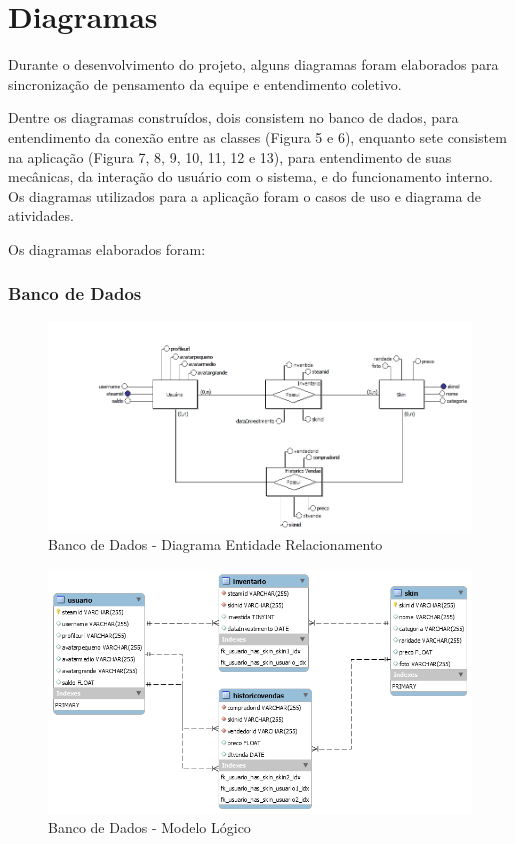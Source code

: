 \chapter[Diagramas]{Diagramas}
Durante o desenvolvimento do projeto, alguns diagramas foram elaborados para sincronização de pensamento da equipe e entendimento coletivo.

Dentre os diagramas construídos, dois consistem no banco de dados, para entendimento da conexão entre as classes (Figura 5 e 6), enquanto sete consistem na aplicação (Figura 7, 8, 9, 10, 11, 12 e 13), para entendimento de suas mecânicas, da interação do usuário com o sistema, e do funcionamento interno. Os diagramas utilizados para a aplicação foram o casos de uso e diagrama de atividades.

Os diagramas elaborados foram:

 \subsection{Banco de Dados}

  \begin{figure}[!htb]
        \centering
        \includegraphics[scale=0.5]{Imagens/Relacionamento.png}
        \caption{Banco de Dados - Diagrama Entidade Relacionamento}
 \end{figure}

  \begin{figure}[!htb]
        \centering
        \includegraphics[scale=0.6]{Imagens/Logico.png}
        \caption{Banco de Dados - Modelo Lógico}
 \end{figure}

